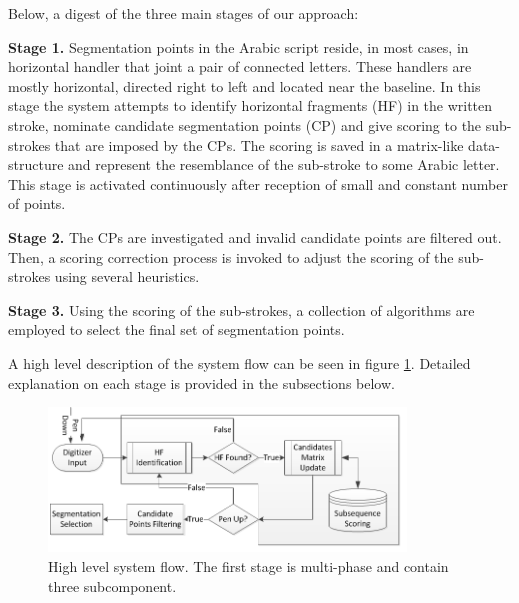 \documentclass[journal,compsoc]{IEEEtran}
\begin{document}
Below, a digest of the three main stages of our approach: 

\textbf{Stage 1.} Segmentation points in the Arabic script reside, in most cases, in horizontal handler that joint a pair of connected letters. These handlers are mostly horizontal, directed right to left and located near the baseline. In this stage the system attempts to identify horizontal fragments (HF) in the written stroke, nominate candidate segmentation points (CP) and give scoring to the sub-strokes that are imposed by the CPs. The scoring is saved in a matrix-like data-structure and represent the resemblance of the sub-stroke to some Arabic letter. This stage is activated continuously after reception of small and constant number of points. 

\textbf{Stage 2.} The CPs are investigated and invalid candidate points are filtered out. Then, a scoring correction process is invoked to adjust the scoring of the sub-strokes using several heuristics.

\textbf{Stage 3.} Using the scoring of the sub-strokes, a collection of algorithms are employed to select the final set of segmentation points.

A high level description of the system flow can be seen in figure \ref{fig:system_flow}. Detailed explanation on each stage is provided in the subsections below.

\begin{figure}
\centering
\includegraphics[width=9.5cm]{./figures/system_flow}
\caption{High level system flow. The first stage is multi-phase and contain three subcomponent. }
\label{fig:system_flow}
\end{figure}
\end{document}
